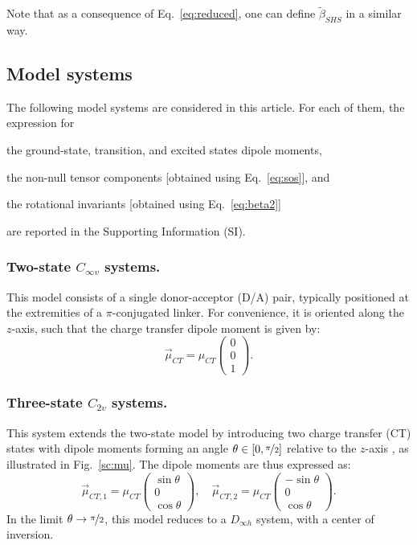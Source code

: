 \documentclass[USenglish]{article}
\begin{document}
Note that as a consequence of Eq.~\eqref{eq:reduced}, one can define $\tilde\beta_{SHS}$ in a similar way.

\subsection{Model systems}

The following model systems are considered in this article. For each of them, the expression for \begin{inparaenum}[i)]
	\item the ground-state, transition, and excited states dipole moments,
	\item the non-null tensor components [obtained using Eq.~\ref{eq:sos}], and
	\item the rotational invariants [obtained using Eq.~\eqref{eq:beta2}]
\end{inparaenum} are reported in the Supporting Information (SI).

\subsubsection{Two-state $C_{\infty v}$ systems.}  
This model consists of a single donor-acceptor (D/A) pair, typically positioned at the extremities of a $\pi$-conjugated linker. For convenience, it is oriented along the $z$-axis, such that the charge transfer dipole moment is given by:  
\begin{equation*}
	\vec{\mu}_{CT} = \mu_{CT} \begin{pmatrix} 0 \\ 0 \\ 1 \end{pmatrix}.
\end{equation*}

\subsubsection{Three-state $C_{2v}$ systems.}  
This system extends the two-state model by introducing two charge transfer (CT) states with dipole moments forming an angle $\theta \in [0, \nicefrac{\pi}{2}]$ relative to the $z$-axis \cite{yangLargeOffDiagonalContribution2003}, as illustrated in Fig.~\ref{sc:mu}. The dipole moments are thus expressed as:  
\begin{equation*}
	\vec{\mu}_{CT,1} = \mu_{CT} \begin{pmatrix} \sin\theta \\ 0 \\ \cos\theta \end{pmatrix}, \quad  
	\vec{\mu}_{CT,2} = \mu_{CT} \begin{pmatrix} -\sin\theta \\ 0 \\ \cos\theta \end{pmatrix}.
\end{equation*}
In the limit $\theta \to \nicefrac{\pi}{ 2}$, this model reduces to a $D_{\infty h}$ system, with a center of inversion.
\end{document}
